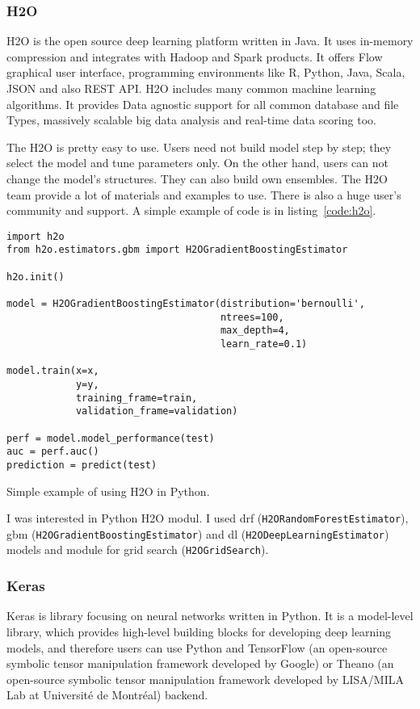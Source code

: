 \documentclass[thesis=M,english]{FITthesis}[2012/10/20]
\begin{document}
\subsubsection{H2O}
H2O is the open source deep learning platform written in Java. It uses in-memory compression and integrates with Hadoop and Spark products. It offers Flow graphical user interface, programming environments like R, Python, Java, Scala, JSON and also REST API. H2O includes many common machine learning algorithms. It provides Data agnostic support for all common database and file Types, massively scalable big data analysis and real-time data scoring too.\cite{h2o_ML_booklet}

The H2O is pretty easy to use. Users need not build model step by step; they select the model and tune parameters only. On the other hand, users can not change the model's structures. They can also build own ensembles. The H2O team provide a lot of materials and examples to use. There is also a huge user's community and support.\cite{h2o_ML_booklet} A simple example of code is in listing~\ref{code:h2o}.


\begin{listing}
\begin{scriptsize}
\begin{verbatim}
import h2o
from h2o.estimators.gbm import H2OGradientBoostingEstimator

h2o.init()

model = H2OGradientBoostingEstimator(distribution='bernoulli',
                                     ntrees=100,
                                     max_depth=4,
                                     learn_rate=0.1)

model.train(x=x,
            y=y, 
            training_frame=train,
            validation_frame=validation)
            
perf = model.model_performance(test)
auc = perf.auc()
prediction = predict(test)
\end{verbatim}
\caption{Simple example of using H2O in Python.}
\label{code:h2o}
\end{scriptsize}
\end{listing}


I was interested in Python H2O modul. I used \gls{drf} (\texttt{H2O\-Ran\-dom\-Forest\-Esti\-ma\-tor}), \gls{gbm}  (\texttt{H2O\-Gradient\-Boosting\-Esti\-ma\-tor}) and \gls{dl} (\texttt{H2O\-Deep\-Lear\-ning\-Esti\-ma\-tor}) models and module for grid search (\texttt{H2O\-Grid\-Search}). 

\subsubsection{Keras}
Keras is library focusing on neural networks written in Python. It is a model-level library, which provides high-level building blocks for developing deep learning models, and therefore users can use Python and TensorFlow (an open-source symbolic tensor manipulation framework developed by Google) or Theano (an open-source symbolic tensor manipulation framework developed by LISA/MILA Lab at Université de Montréal) backend.
\end{document}
